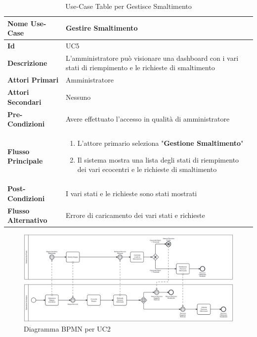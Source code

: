         \begin{table}[h]
            \centering
            \renewcommand{\arraystretch}{1.3} %
            \begin{tabular}{|p{4cm}|p{10cm}|}
                \hline
                \textbf{Nome Use-Case}& \textbf{Gestire Smaltimento}\\
                \hline
                \textbf{Id} & UC5\\
                \hline
                \textbf{Descrizione}& L'amministratore può visionare una dashboard con i vari stati di riempimento e le richieste di smaltimento\\
                \hline
                \textbf{Attori Primari}& Amministratore\\
                \hline
                \textbf{Attori Secondari}& Nessuno\\
                \hline
                \textbf{Pre-Condizioni}& Avere effettuato l'accesso in qualità di amministratore\\
                \hline
                \textbf{Flusso Principale}& 
                \begin{enumerate}
                    \item L'attore primario seleziona "\textbf{Gestione Smaltimento}"
                    \item Il sistema mostra una lista degli stati di riempimento dei vari ecocentri e le richieste di smaltimento
                \end{enumerate}
                \\
                \hline
                \textbf{Post-Condizioni} & I vari stati e le richieste sono stati mostrati \\
                \hline
                \textbf{Flusso Alternativo}& Errore di caricamento dei vari stati e richieste \\
                \hline
            \end{tabular}
            \caption{Use-Case Table per Gestisce Smaltimento}
            \label{tab:use_case}
        \end{table}

        \begin{figure}[h]
            \centering
            \includegraphics[width=1\linewidth]{D1-G1//Img/Consulta Mappa - BPMN.png}
            \caption{Diagramma BPMN per UC2}
            \label{fig:BPMN}
        \end{figure}